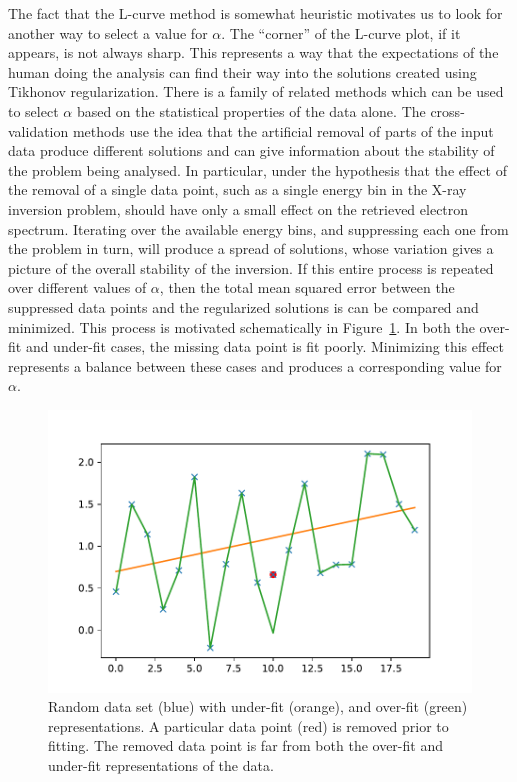 The fact that the L-curve method is somewhat heuristic motivates us to look for another way to select a value for $\alpha$. The ``corner'' of the L-curve plot, if it appears, is not always sharp. This represents a way that the expectations of the human doing the analysis can find their way into the solutions created using Tikhonov regularization. There is a family of related methods which can be used to select $\alpha$ based on the statistical properties of the data alone. The cross-validation methods use the idea that the artificial removal of parts of the input data produce different solutions and can give information about the stability of the problem being analysed. In particular, under the hypothesis that the effect of the removal of a single data point, such as a single energy bin in the X-ray inversion problem, should have only a small effect on the retrieved electron spectrum. Iterating over the available energy bins, and suppressing each one from the problem in turn, will produce a spread of solutions, whose variation gives a picture of the overall stability of the inversion. If this entire process is repeated over different values of $\alpha$, then the total mean squared error between the suppressed data points and the regularized solutions is can be compared and minimized. This process is motivated schematically in Figure~\ref{cross_validation_motivation}. In both the over-fit and under-fit cases, the missing data point is fit poorly. Minimizing this effect represents a balance between these cases and produces a corresponding value for $\alpha$. 

\begin{figure}[p]
    \centering
    \includegraphics[width=1.0\textwidth]{figures/chapter_4/cross_validation_motivation/fig.pdf}
    \caption{Random data set (blue) with under-fit (orange), and over-fit (green) representations. A particular data point (red) is removed prior to fitting. The removed data point is far from both the over-fit and under-fit representations of the data. }
    \label{cross_validation_motivation}
\end{figure}

